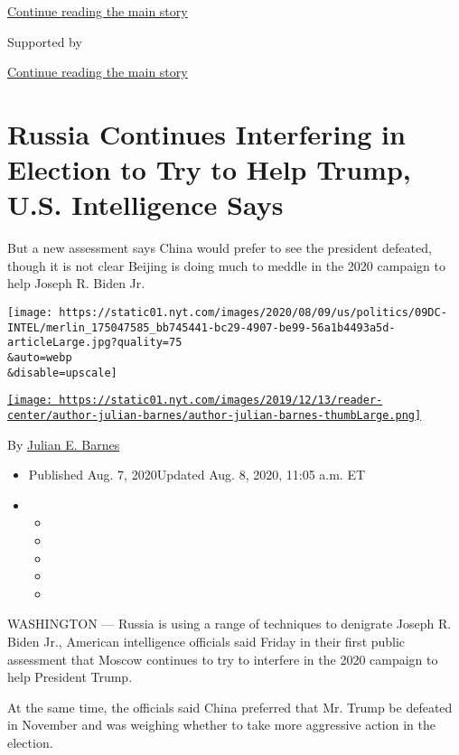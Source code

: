 \protect\hyperlink{after-top}{Continue reading the main story}

Supported by

\protect\hyperlink{after-sponsor}{Continue reading the main story}

\hypertarget{russia-continues-interfering-in-election-to-try-to-help-trump-us-intelligence-says}{%
\section{Russia Continues Interfering in Election to Try to Help Trump,
U.S. Intelligence
Says}\label{russia-continues-interfering-in-election-to-try-to-help-trump-us-intelligence-says}}

But a new assessment says China would prefer to see the president
defeated, though it is not clear Beijing is doing much to meddle in the
2020 campaign to help Joseph R. Biden Jr.

\texttt{[image: https://static01.nyt.com/images/2020/08/09/us/politics/09DC-INTEL/merlin\_175047585\_bb745441-bc29-4907-be99-56a1b4493a5d-articleLarge.jpg?quality=75\\\&auto=webp\\\&disable=upscale]}

\href{https://www.nytimes.com/by/julian-e-barnes}{\texttt{[image: https://static01.nyt.com/images/2019/12/13/reader-center/author-julian-barnes/author-julian-barnes-thumbLarge.png]}}

By \href{https://www.nytimes.com/by/julian-e-barnes}{Julian E. Barnes}

\begin{itemize}
\item
  Published Aug. 7, 2020Updated Aug. 8, 2020, 11:05 a.m. ET
\item
  \begin{itemize}
  \item
  \item
  \item
  \item
  \item
  \end{itemize}
\end{itemize}

WASHINGTON --- Russia is using a range of techniques to denigrate Joseph
R. Biden Jr., American intelligence officials said Friday in their first
public assessment that Moscow continues to try to interfere in the 2020
campaign to help President Trump.

At the same time, the officials said China preferred that Mr. Trump be
defeated in November and was weighing whether to take more aggressive
action in the election.

